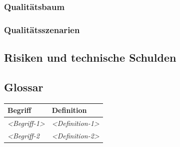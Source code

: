 \subsubsection{Qualitätsbaum}\label{_qualit_tsbaum}

\subsubsection{Qualitätsszenarien}\label{_qualit_tsszenarien}

\subsection{Risiken und technische Schulden}\label{section-technical-risks}

\subsection{Glossar}\label{section-glossary}

\begin{longtable}[]{@{}ll@{}}
\toprule
\begin{minipage}[b]{0.31\columnwidth}\raggedright\strut
Begriff\strut
\end{minipage} & \begin{minipage}[b]{0.63\columnwidth}\raggedright\strut
Definition\strut
\end{minipage}\tabularnewline
\midrule
\endhead
\begin{minipage}[t]{0.31\columnwidth}\raggedright\strut
\emph{\textless{}Begriff-1\textgreater{}}\strut
\end{minipage} & \begin{minipage}[t]{0.63\columnwidth}\raggedright\strut
\emph{\textless{}Definition-1\textgreater{}}\strut
\end{minipage}\tabularnewline
\begin{minipage}[t]{0.31\columnwidth}\raggedright\strut
\emph{\textless{}Begriff-2}\strut
\end{minipage} & \begin{minipage}[t]{0.63\columnwidth}\raggedright\strut
\emph{\textless{}Definition-2\textgreater{}}\strut
\end{minipage}\tabularnewline
\bottomrule
\end{longtable}
